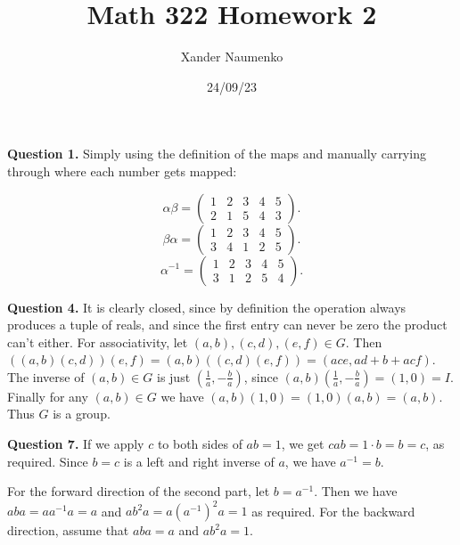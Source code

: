 \documentclass[letterpaper, reqno,11pt]{article}
\begin{document}
\title{Math 322 Homework 2}
\date{24/09/23}
\author{Xander Naumenko}
\maketitle

{\medskip\noindent\bf Question 1.} Simply using the definition of the maps and manually carrying through where each number gets mapped:

\[
    \alpha\beta=\begin{pmatrix} 1&2&3&4&5\\ 2&1&5&4&3 \end{pmatrix} 
.\]
\[
    \beta\alpha=\begin{pmatrix} 1&2&3&4&5\\ 3&4&1&2&5 \end{pmatrix} 
.\]
\[
    \alpha ^{-1}=\begin{pmatrix} 1&2&3&4&5\\ 3&1&2&5&4 \end{pmatrix} 
.\]

{\medskip\noindent\bf Question 4.} It is clearly closed, since by definition the operation always produces a tuple of reals, and since the first entry can never be zero the product can't either. For associativity, let $(a,b),(c,d),(e,f)\in G$. Then $((a,b)(c,d))(e,f)=(a,b)((c,d)(e,f))=(ace, ad+b+acf)$. The inverse of $(a,b)\in G$ is just $(\frac{1}{a}, -\frac{b}{a})$, since $(a,b)(\frac{1}{a},-\frac{b}{a})=(1,0)=I$. Finally for any $(a,b)\in G$ we have $(a,b)(1,0)=(1,0)(a,b)=(a,b)$. Thus $G$ is a group.

{\medskip\noindent\bf Question 7.} If we apply $c$ to both sides of $ab=1$, we get $cab=1\cdot b=b=c$, as required. Since $b=c$ is a left and right inverse of $a$, we have $a^{-1}=b$.

For the forward direction of the second part, let $b=a^{-1}$. Then we have $aba=aa^{-1}a=a$ and $ab^2a=a(a^{-1})^2a=1$ as required. For the backward direction, assume that $aba=a$ and $ab^2a=1$. 
\end{document}
